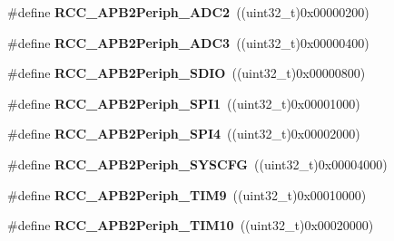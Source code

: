\begin{DoxyCompactItemize}
\mbox{\label{group___r_c_c___a_p_b2___peripherals_ga4fd76e573e827702568d6064e33448b5}} 
\#define {\bfseries R\+C\+C\+\_\+\+A\+P\+B2\+Periph\+\_\+\+A\+D\+C2}~((uint32\+\_\+t)0x00000200)
\item 
\mbox{\label{group___r_c_c___a_p_b2___peripherals_ga371d55bbf17bf965a213c59f2d276d72}} 
\#define {\bfseries R\+C\+C\+\_\+\+A\+P\+B2\+Periph\+\_\+\+A\+D\+C3}~((uint32\+\_\+t)0x00000400)
\item 
\mbox{\label{group___r_c_c___a_p_b2___peripherals_ga1349ee7f3bca5e78a66d005c4d69ffb6}} 
\#define {\bfseries R\+C\+C\+\_\+\+A\+P\+B2\+Periph\+\_\+\+S\+D\+IO}~((uint32\+\_\+t)0x00000800)
\item 
\mbox{\label{group___r_c_c___a_p_b2___peripherals_ga289cc086580f4b6a080ea0ed3dd4a7af}} 
\#define {\bfseries R\+C\+C\+\_\+\+A\+P\+B2\+Periph\+\_\+\+S\+P\+I1}~((uint32\+\_\+t)0x00001000)
\item 
\mbox{\label{group___r_c_c___a_p_b2___peripherals_ga2bef439bd9ff785a8486d3daf7c48df9}} 
\#define {\bfseries R\+C\+C\+\_\+\+A\+P\+B2\+Periph\+\_\+\+S\+P\+I4}~((uint32\+\_\+t)0x00002000)
\item 
\mbox{\label{group___r_c_c___a_p_b2___peripherals_ga880f2dc5318286b7fe22f7d1cca117dd}} 
\#define {\bfseries R\+C\+C\+\_\+\+A\+P\+B2\+Periph\+\_\+\+S\+Y\+S\+C\+FG}~((uint32\+\_\+t)0x00004000)
\item 
\mbox{\label{group___r_c_c___a_p_b2___peripherals_ga24d0145dc172bc27ed580770cf15e4d9}} 
\#define {\bfseries R\+C\+C\+\_\+\+A\+P\+B2\+Periph\+\_\+\+T\+I\+M9}~((uint32\+\_\+t)0x00010000)
\item 
\mbox{\label{group___r_c_c___a_p_b2___peripherals_ga75069120ecbe86920b39c2b75c909438}} 
\#define {\bfseries R\+C\+C\+\_\+\+A\+P\+B2\+Periph\+\_\+\+T\+I\+M10}~((uint32\+\_\+t)0x00020000)
\item 
\mbox{\label{group___r_c_c___a_p_b2___peripherals_gaba591104f4e31b1e8ce98c269035850f}} 

\end{DoxyCompactItemize}
